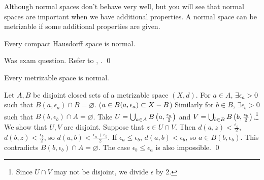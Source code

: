 
Although normal spaces don't behave very well, but you will see that normal spaces are important when we have additional properties. A normal space can be metrizable if some additional properties are given.

 Every compact Hausdorff space is normal.

\pf Was exam question. Refer to , . \qed

 Every metrizable space is normal.

\pf Let \(A, B\) be disjoint closed sets of a metrizable space \((X, d)\). For \(a \in A\), \(\exists \epsilon_a > 0\) such that \(B(a, \epsilon_a) \cap B = \varnothing\). (\(a \in B(a, \epsilon_a) \subset X - B\)) Similarly for \(b \in B\), \(\exists \epsilon_b > 0\) such that \(B(b, \epsilon_b) \cap A = \varnothing\). Take \(U = \bigcup_{a \in A} B\left( a, \frac{\epsilon_a}{2} \right)\) and \(V = \bigcup_{b \in B} B\left( b, \frac{\epsilon_b}{2} \right)\).\footnote{Since \(U \cap V\) may not be disjoint, we divide \(\epsilon\) by 2.} We show that \(U, V\) are disjoint. Suppose that \(z \in U \cap V\). Then \(d(a, z) < \frac{\epsilon_a}{2}\), \(d(b, z) < \frac{\epsilon_b}{2}\), so \(d(a, b) < \frac{\epsilon_a + \epsilon_b}{2}\). If \(\epsilon_a \leq \epsilon_b\), \(d(a, b) < \epsilon_b\), so \(a \in B(b, \epsilon_b)\). This contradicts \(B(b, \epsilon_b) \cap A = \varnothing\). The case \(\epsilon_b \leq \epsilon_a\) is also impossible. \qed

\pagebreak
